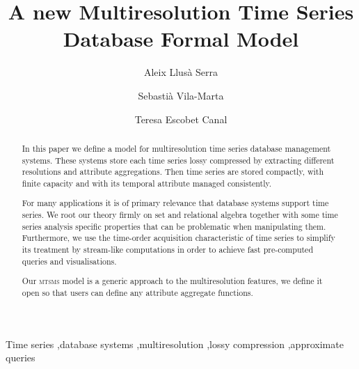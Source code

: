 \documentclass[
  review,
  twocolumn,
  5p,
  sort&compress,
]{elsarticle}
\newcommand{\acro}[1]{\textsc{\lowercase{#1}}}
\begin{document}


\begin{frontmatter}

  \title{A new Multiresolution Time Series \\ Database Formal Model}


  \author
  [dipse]
  {Aleix Llus\`{a} Serra
  }

  \author
  [dipse]
  {Sebasti\`{a} Vila-Marta
  }

  \author
  [dipse]
  {Teresa Escobet Canal
  }



  \address
  [dipse]
  {Department of Electronic System Design and Programming\\ Universitat Polit\`{e}cnica de Catalunya\\ Av.~Bases de Manresa 61--73, 08242 Manresa, ES-CT}



  \begin{abstract}
    In this paper we define a model for multiresolution time series
    database management systems. These systems store each time series
    lossy compressed by extracting different resolutions and attribute
    aggregations. Then time series are stored compactly, with finite
    capacity and with its temporal attribute managed consistently.

    For many applications it is of primary relevance that database
    systems support time series.  We root our theory firmly on set and
    relational algebra together with some time series analysis
    specific properties that can be problematic when manipulating
    them.  Furthermore, we use the time-order acquisition
    characteristic of time series to simplify its treatment by
    stream-like computations in order to achieve fast pre-computed
    queries and visualisations.

 Our
\acro{MTSMS} model is a generic approach to the multiresolution
features, we define it open so that users can define any attribute
aggregate functions.

  \end{abstract}


  \begin{keyword}
    Time series \sep database systems \sep multiresolution \sep lossy
    compression \sep approximate queries
  \end{keyword}

\end{frontmatter}
\end{document}
